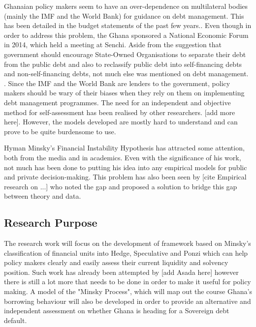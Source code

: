 \documentclass[a4paper]{article}
\begin{document}

	Ghanaian policy makers seem to have an over-dependence on multilateral bodies (mainly the IMF and the World Bank) for guidance on debt management. This has been detailed in the budget statements of the past few years.\cite{Ken2017,Ken2017nov,Terkper2015}. Even though in order to address this problem, the Ghana sponsored a National Economic Forum in 2014, which held a meeting at Senchi. Aside from the suggestion that government should encourage State-Owned Organisations to separate their debt from the public debt and also to reclassify public debt into self-financing debts and non-self-financing debts, not much else was mentioned on debt management. \cite{NEF2014}. Since the IMF and the World Bank are lenders to the government, policy makers should be wary of their biases when they rely on them on implementing debt management programmes. The need for an independent and objective method for self-assessment has been realised by other researchers. \cite{Ana-Mari-2007, Marc-2008} [add more here]. However, the models developed are mostly hard to understand and can prove to be quite burdensome to use.
	
	Hyman Minsky's Financial Instability Hypothesis has attracted some attention, both from the media and in academics. Even with the significance of his work, not much has been done to putting his idea into any empirical models for public and private decision-making. This problem has also been seen by [cite Empirical research on ...] who noted the gap and proposed a solution to bridge this gap between theory and data.
	
	\subsection{Research Purpose}
	The research work will focus on the development of framework based on Minsky's classification of financial units into Hedge, Speculative and Ponzi which can help policy makers clearly and easily assess their current liquidity and solvency position. Such work has already been attempted by  [add Asada here] however there is still a lot more that needs to be done in order to make it useful for policy making. A model of the "Minsky Process", which will map out the course Ghana's borrowing behaviour will also be developed in order to provide an alternative and independent assessment on whether Ghana is heading for a Sovereign debt default.
	
\end{document}
